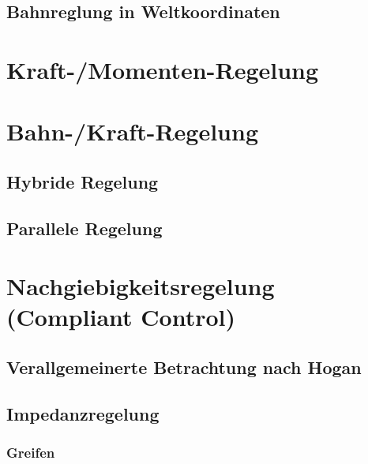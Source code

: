\documentclass[a4paper, 11pt, accentcolor = tud3b]{tudreport}
\begin{document}
			\subsection{Bahnreglung in Weltkoordinaten} %

		\section{Kraft-/Momenten-Regelung} %

		\section{Bahn-/Kraft-Regelung} %

			\subsection{Hybride Regelung} %

			\subsection{Parallele Regelung} %

		\section{Nachgiebigkeitsregelung (Compliant Control)} %

			\subsection{Verallgemeinerte Betrachtung nach Hogan} %

			\subsection{Impedanzregelung} %

				\subsubsection{Greifen} %
\end{document}
